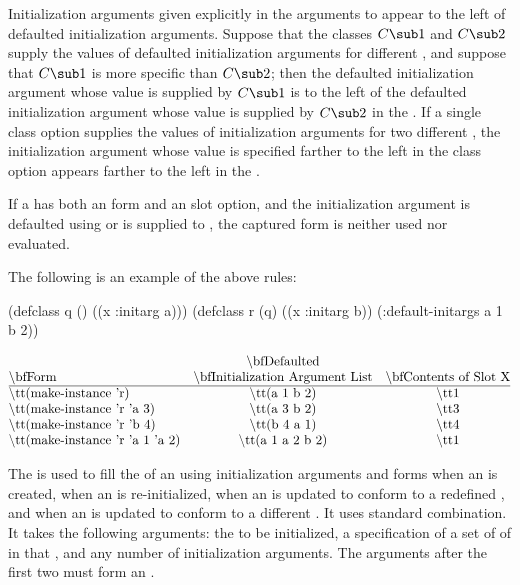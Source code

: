 Initialization arguments given explicitly in the arguments to
 appear to the left of defaulted initialization
arguments. Suppose that the classes $C\sub 1$ and $C\sub 2$ supply the
values of defaulted initialization arguments for different ,
and suppose that $C\sub 1$ is more specific than $C\sub 2$; then the
defaulted initialization argument whose value is supplied by $C\sub 1$
is to the left of the defaulted initialization argument whose value is
supplied by $C\sub 2$ in the .  If a single  class option supplies the
values of initialization arguments for two different , the
initialization argument whose value is specified farther to the left in
the  class option appears farther to the left in
the .

                                                        
If a  has both an  form and an 
 slot option, and the initialization argument is defaulted
using  or is supplied to ,
the captured  form is neither used nor evaluated.

The following is an example of the above rules:

\code
 (defclass q () ((x :initarg a)))
 (defclass r (q) ((x :initarg b))
   (:default-initargs a 1 b 2))
\endcode

$$\vbox{\halign{\strut#\hfil&\quad\hfil#\hfil&\quad\hfil#\hfil\cr
{}&\bf Defaulted&{}\cr
\bf Form&\bf Initialization Argument List&\bf Contents of Slot X\cr
\noalign{\hrule}
{\tt (make-instance 'r)}&{\tt (a 1 b 2)}&{\tt 1}\cr
{\tt (make-instance 'r 'a 3)}&{\tt (a 3 b 2)}&{\tt 3}\cr
{\tt (make-instance 'r 'b 4)}&{\tt (b 4 a 1)}&{\tt 4}\cr
{\tt (make-instance 'r 'a 1 'a 2)}&{\tt (a 1 a 2 b 2)}&{\tt 1}\cr}}$$

\endsubsection%

                      
The   is used to fill the 
of an  
using initialization arguments and 
forms when an  is created, when an 
 is re-initialized,
when an  
is updated to conform to a redefined , and when
an  is updated to conform to a different .
It uses
standard  combination. It takes the following arguments: the
 to be initialized, a 
specification of a set of  of 
 in that , and any number of initialization
arguments.  The arguments after the first two must form an
.
                        
